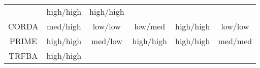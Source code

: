 \documentclass[12pt,twoside,openany,\mydriver]{thesis}  %
\begin{document}
\begin{longtable}[]{@{}cccccc@{}}
\begin{minipage}[t]{0.13\columnwidth}
\end{minipage} & \begin{minipage}[t]{0.19\columnwidth}\centering
high/high\strut
\end{minipage} & \begin{minipage}[t]{0.11\columnwidth}\centering
high/high\strut
\end{minipage}\tabularnewline
\begin{minipage}[t]{0.10\columnwidth}\centering
CORDA\strut
\end{minipage} & \begin{minipage}[t]{0.12\columnwidth}\centering
med/high\strut
\end{minipage} & \begin{minipage}[t]{0.18\columnwidth}\centering
low/low\strut
\end{minipage} & \begin{minipage}[t]{0.13\columnwidth}\centering
low/med\strut
\end{minipage} & \begin{minipage}[t]{0.19\columnwidth}\centering
high/high\strut
\end{minipage} & \begin{minipage}[t]{0.11\columnwidth}\centering
low/low\strut
\end{minipage}\tabularnewline
\begin{minipage}[t]{0.10\columnwidth}\centering
PRIME\strut
\end{minipage} & \begin{minipage}[t]{0.12\columnwidth}\centering
high/high\strut
\end{minipage} & \begin{minipage}[t]{0.18\columnwidth}\centering
med/low\strut
\end{minipage} & \begin{minipage}[t]{0.13\columnwidth}\centering
high/high\strut
\end{minipage} & \begin{minipage}[t]{0.19\columnwidth}\centering
high/high\strut
\end{minipage} & \begin{minipage}[t]{0.11\columnwidth}\centering
med/med\strut
\end{minipage}\tabularnewline
\begin{minipage}[t]{0.10\columnwidth}\centering
TRFBA\strut
\end{minipage} & \begin{minipage}[t]{0.12\columnwidth}\centering
high/high\strut
\end{minipage} & \begin{minipage}[t]{0.18\columnwidth}\centering

\end{minipage}
\end{longtable}
\end{document}
